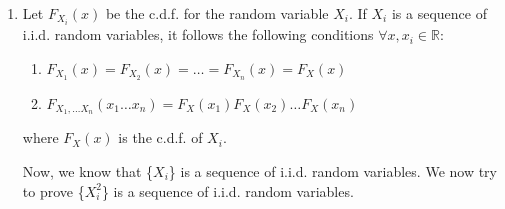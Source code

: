 \documentclass[journal,12pt,twocolumn]{IEEEtran}
\begin{document}
\begin{enumerate}
\item \begin{lemma}
    Let $F_{X_i}(x)$ be the c.d.f. for the random variable $X_i$.
If ${X_i}$ is a sequence of i.i.d. random variables, it follows the following conditions $\forall x,x_i \in \mathbb{R}$:
    \begin{enumerate}
        \item \begin{math}F_{X_1}(x)=F_{X_2}(x)=\ldots=F_{X_n}(x)=F_X(x)\end{math}
        \item \begin{math}F_{X_1,\ldots X_n}(x_1\ldots x_n)=F_X(x_1)F_X(x_2)\ldots F_X(x_n)\end{math}
    \end{enumerate}
where $F_X(x)$ is the c.d.f. of $X_i$.
\end{lemma}

Now, we know that \{$X_i$\} is a sequence of i.i.d. random variables. We now try to prove \{$X_i^2$\} is a sequence of i.i.d. random variables.


\end{enumerate}
\end{document}
